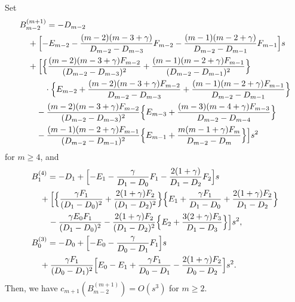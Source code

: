 \documentclass[10pt,a4paper]{amsart}
\begin{document}
\begin{prop}
Set
\begin{align}
& B_{m-2}^{(m+1)} = -D_{m-2} \label{eq:Bm+1m-2} \\
& \quad + \Bigl[ -E_{m-2}-\frac{(m-2)(m-3+\gamma)}{D_{m-2}-D_{m-3}}F_{m-2}-\frac{(m-1)(m-2+\gamma)}{D_{m-2}-D_{m-1}}F_{m-1}\Bigr] s \nonumber \\
& \quad + \Bigl[ \Bigl\{ \frac{(m-2)(m-3+\gamma) F_{m-2} }{(D_{m-2}-D_{m-3})^2} + \frac{(m-1)(m-2+\gamma) F_{m-1}}{(D_{m-2}-D_{m-1})^2} \Bigr\} \nonumber \\
& \quad \qquad \cdot \Bigl\{ E_{m-2} + \frac{(m-2)(m-3+\gamma) F_{m-2} }{D_{m-2}-D_{m-3}} + \frac{(m-1)(m-2+\gamma) F_{m-1}}{D_{m-2}-D_{m-1}} \Bigr\} \nonumber \\
& \quad \quad - \frac{(m-2)(m-3+\gamma) F_{m-2} }{(D_{m-2}-D_{m-3})^2} \Bigl\{ E_{m-3}+\frac{(m-3)(m-4+\gamma) F_{m-3}}{D_{m-2}-D_{m-4}} \Bigr\} \nonumber \\
& \quad \quad - \frac{(m-1)(m-2+\gamma) F_{m-1}}{(D_{m-2}-D_{m-1})^2} \Bigl\{ E_{m-1}+\frac{m(m-1+\gamma) F_{m}}{D_{m-2}-D_{m}} \Bigr\} \Bigr] s^2 \nonumber 
\end{align}
for $m \geq 4$, and
\begin{align}
& B_{1}^{(4)} = -D_{1} + \Bigl[ -E_{1}-\frac{\gamma}{D_{1}-D_{0}}F_{1}-\frac{2(1+\gamma)}{D_{1}-D_{2}}F_{2}\Bigr] s \\
& \quad + \Bigl[ \Bigl\{ \frac{\gamma F_{1} }{(D_{1}-D_{0})^2} + \frac{2(1+\gamma) F_{2}}{(D_{1}-D_{2})^2} \Bigr\}  \Bigl\{ E_{1} + \frac{\gamma F_{1} }{D_{1}-D_{0}} + \frac{2(1+\gamma) F_{2}}{D_{1}-D_{2}} \Bigr\} \nonumber \\
& \quad \quad - \frac{\gamma E_{0} F_{1} }{(D_{1}-D_{0})^2}  - \frac{2(1+\gamma) F_{2}}{(D_{1}-D_{2})^2} \Bigl\{ E_{2}+\frac{3(2+\gamma) F_{3}}{D_{1}-D_{3}} \Bigr\} \Bigr] s^2 , \nonumber \\
& B_{0}^{(3)} = -D_{0} + \Bigl[ -E_{0}-\frac{\gamma}{D_{0}-D_{1}}F_{1}\Bigr] s \\
& \quad + \frac{\gamma F_{1}}{(D_{0}-D_{1})^2} \Bigl[ E_{0} - E_{1} + \frac{\gamma F_{1}}{D_{0}-D_{1}}  - \frac{2(1+\gamma) F_{2}}{D_{0}-D_{2}} \Bigr] s^2 . \nonumber 
\end{align}
Then, we have $c_{m+1} (B_{m-2}^{(m+1)}) = O(s^3) $ for $m \geq 2$.
\end{prop}
\end{document}
